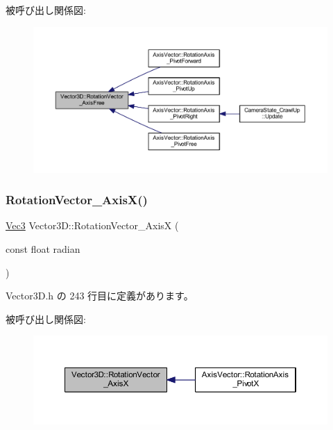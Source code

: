 被呼び出し関係図\+:
\nopagebreak
\begin{figure}[H]
\begin{center}
\leavevmode
\includegraphics[width=350pt]{class_vector3_d_aadbe9f3e0ee3298c59cf123b592140bd_icgraph}
\end{center}
\end{figure}
\mbox{\label{class_vector3_d_a0b058c605bbea7ea97bd96efa3c0bc26}} 
\subsubsection{\texorpdfstring{Rotation\+Vector\+\_\+\+Axis\+X()}{RotationVector\_AxisX()}}
{\footnotesize\ttfamily \mbox{\hyperlink{_vector3_d_8h_ab16f59e4393f29a01ec8b9bbbabbe65d}{Vec3}} Vector3\+D\+::\+Rotation\+Vector\+\_\+\+AxisX (\begin{DoxyParamCaption}\item[{const float}]{radian }\end{DoxyParamCaption})\hspace{0.3cm}{\ttfamily [inline]}}



 Vector3\+D.\+h の 243 行目に定義があります。

被呼び出し関係図\+:
\nopagebreak
\begin{figure}[H]
\begin{center}
\leavevmode
\includegraphics[width=350pt]{class_vector3_d_a0b058c605bbea7ea97bd96efa3c0bc26_icgraph}
\end{center}
\end{figure}
\mbox{\label{class_vector3_d_a0a8556c9bd5caef8592174a8c095080f}} 
